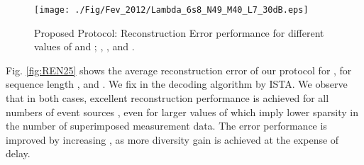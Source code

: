 \documentclass[letterpaper,conference]{IEEEtran}
\begin{document}
\begin{figure}[h]
\begin{center}
   \texttt{[image: ./Fig/Fev\_2012/Lambda\_6s8\_N49\_M40\_L7\_30dB.eps]} \vspace{-0.6cm}
\caption{Proposed Protocol: Reconstruction Error performance for different values of  and ; , ,  and .}
\label{fig:REN49Lambda}
\end{center}
\end{figure}



Fig. \ref{fig:REN25} shows the average reconstruction error of our protocol for , for sequence length ,  and . We fix  in the decoding algorithm by ISTA. We observe that in both cases, excellent reconstruction performance is achieved for all numbers of event sources , even for larger values of  which imply lower sparsity in the number of superimposed measurement data. The error performance is improved by increasing , as more diversity gain is achieved at the expense of delay.
\end{document}
